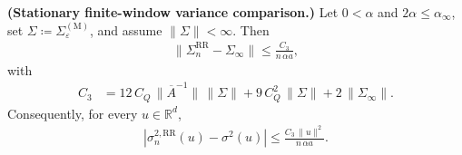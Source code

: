 \begin{lemma}\label{lem:RR-variance-comparison}
  \textbf{(Stationary finite-window variance comparison.)}
  Let \(0 < \alpha\) and \(2 \alpha \le \alpha_\infty\),
  set \(\Sigma \coloneqq \Sigma_{\varepsilon}^{(\text{M})}\),
  and assume \(\lVert  \Sigma  \rVert < \infty\). Then
\begin{equation}
\begin{aligned}
  \lVert  \Sigma_n^{\text{RR}} - \Sigma_\infty  \rVert
    \le \frac{C_3}{n \, \alpha a},
\end{aligned}
\end{equation}
  with
\begin{equation}
\begin{aligned}
  C_3
    &= 12 \, C_Q \, \lVert \overline{A}^{-1} \rVert \, \lVert \Sigma \rVert
       + 9 \, C_Q^2 \, \lVert \Sigma \rVert
       + 2 \, \lVert \Sigma_\infty \rVert .
\end{aligned}
\end{equation}
  Consequently, for every \(u \in \mathbb{R}^d\),
\begin{equation}
\begin{aligned}
  | \sigma_n^{2, \text{RR}}(u) - \sigma^2(u) |
    \le \frac{C_3 \, \lVert  u  \rVert^2}{n \, \alpha a}.
\end{aligned}
\end{equation}
\end{lemma}

